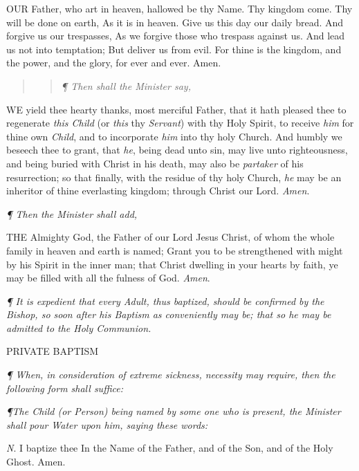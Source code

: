 OUR
Father, who art in heaven, hallowed be thy Name. Thy kingdom come. Thy
will be done on earth, As it is in heaven. Give us this day our daily
bread. And forgive us our trespasses, As we forgive those who trespass
against us. And lead us not into temptation; But deliver us from evil.
For thine is the kingdom, and the power, and the glory, for ever and ever.
Amen.

\begin{quote}

\begin{quote}

\emph{¶
Then shall the Minister say,}

\end{quote}

\end{quote}

WE
yield thee hearty thanks, most merciful Father, that it hath pleased thee
to regenerate \emph{this Child} (or \emph{this} thy \emph{Servant})
with thy Holy Spirit, to receive \emph{him} for thine own \emph{Child},
and to incorporate \emph{him} into thy holy Church. And humbly we beseech
thee to grant, that \emph{he}, being dead unto sin, may live unto righteousness,
and being buried with Christ in his death, may also be \emph{partaker}
of his resurrection; so that finally, with the residue of thy holy Church,
\emph{he} may be an inheritor of thine everlasting kingdom; through
Christ our Lord. \emph{Amen}.

\emph{¶
Then the Minister shall add,}

THE
Almighty God, the Father of our Lord Jesus Christ, of whom the whole family
in heaven and earth is named; Grant you to be strengthened with might
by his Spirit in the inner man; that Christ dwelling in your hearts by
faith, ye may be filled with all the fulness of God. \emph{Amen}.

\emph{¶
It is expedient that every Adult, thus baptized, should be confirmed
by the Bishop, so soon after his Baptism as conveniently may be; that
so he may be admitted to the Holy Communion.}

PRIVATE
BAPTISM

\emph{¶
When, in consideration of extreme sickness, necessity may require, then
the following form shall suffice:}

\emph{¶The Child (or Person) being named by some one who is present,
the Minister shall pour Water upon him, saying these words:}

\emph{N}.
I baptize thee In the Name of the Father, and of the Son, and of the Holy
Ghost. Amen.

